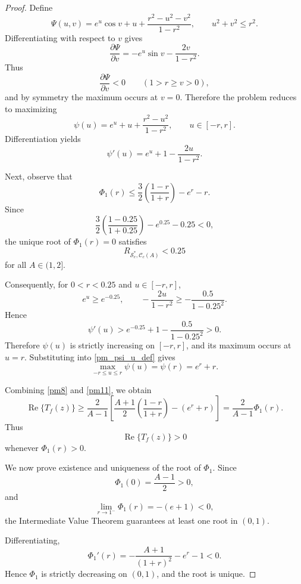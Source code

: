 \documentclass[12pt]{article}
\renewcommand{\Re}{\operatorname{Re}}
\begin{document}
\begin{proof}
Define
\begin{equation}\label{pm_psi_def}
\Psi(u,v)
=
e^u\cos v
+
u
+
\frac{r^2-u^2-v^2}{1-r^2},
\qquad
u^2+v^2\le r^2.
\end{equation}
Differentiating with respect to $v$ gives
\[
\frac{\partial\Psi}{\partial v}
=
-e^u\sin v
-
\frac{2v}{1-r^2}.
\]
Thus
\[
\frac{\partial\Psi}{\partial v}<0
\qquad
(1>r\geq v>0),
\]
and by symmetry the maximum occurs at $v=0$. Therefore the problem reduces to maximizing
\begin{equation}\label{pm_psi_u_def}
\psi(u)
=
e^u
+
u
+
\frac{r^2-u^2}{1-r^2},
\qquad
u\in[-r,r].
\end{equation}
Differentiation yields
\begin{equation}\label{pm_psi_prime}
\psi'(u)
=
e^u
+
1
-
\frac{2u}{1-r^2}.
\end{equation}

Next, observe that
\[
\Phi_1(r)
\le
\frac{3}{2}\left(\frac{1-r}{1+r}\right)-e^r-r.
\]
Since
\[
\frac{3}{2}\left(\frac{1-0.25}{1+0.25}\right)
-e^{0.25}
-0.25
<0,
\]
the unique root of $\Phi_1(r)=0$ satisfies
\[
R_{\mathcal S_e^*,\mathcal C_c(A)}<0.25
\]
for all $A\in(1,2]$.

Consequently, for $0<r<0.25$ and $u\in[-r,r]$,
\[
e^u\ge e^{-0.25},
\qquad
-\frac{2u}{1-r^2}
\ge
-\frac{0.5}{1-0.25^2}.
\]
Hence
\[
\psi'(u)
>
e^{-0.25}
+
1
-
\frac{0.5}{1-0.25^2}
>
0.
\]
Therefore $\psi(u)$ is strictly increasing on $[-r,r]$, and its maximum occurs at $u=r$. Substituting into \eqref{pm_psi_u_def} gives
\begin{equation}\label{pm11}
\max_{-r\le u\le r}\psi(u)
=
\psi(r)
=
e^r+r.
\end{equation}

Combining \eqref{pm8} and \eqref{pm11}, we obtain
\[
\Re\{T_f(z)\}
\ge
\frac{2}{A-1}
\left[
\frac{A+1}{2}\left(\frac{1-r}{1+r}\right)
-
(e^r+r)
\right]
=
\frac{2}{A-1}\Phi_1(r).
\]
Thus
\[
\Re\{T_f(z)\}>0
\]
whenever $\Phi_1(r)>0$.

We now prove existence and uniqueness of the root of $\Phi_1$. Since
\[
\Phi_1(0)=\frac{A-1}{2}>0,
\]
and
\[
\lim_{r\to1^-}\Phi_1(r)=-(e+1)<0,
\]
the Intermediate Value Theorem guarantees at least one root in $(0,1)$.

Differentiating,
\begin{equation}\label{pm_phi_prime}
\Phi_1'(r)
=
-\frac{A+1}{(1+r)^2}
-
e^r
-
1
<
0.
\end{equation}
Hence $\Phi_1$ is strictly decreasing on $(0,1)$, and the root is unique.


\end{proof}
\end{document}

